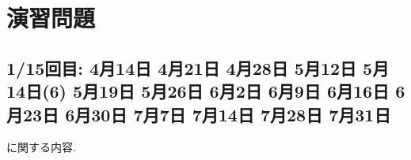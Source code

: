 \chapter{演習問題}

\newcommand{\schoolCalender}[1]{%
\ifcase#1%
\or 4月14日%
\or 4月21日%
\or 4月28日%
\or 5月12日%
\or 5月14日(6)%
\or 5月19日%
\or 5月26日%
\or 6月2日%
\or 6月9日%
\or 6月16日%
\or 6月23日%
\or 6月30日%
\or 7月7日%
\or 7月14日%
\or 7月28日%
\or 7月31日%
\else %
\fi
}







\section{1/15回目: \schoolCalender{1}}
に関する内容.
